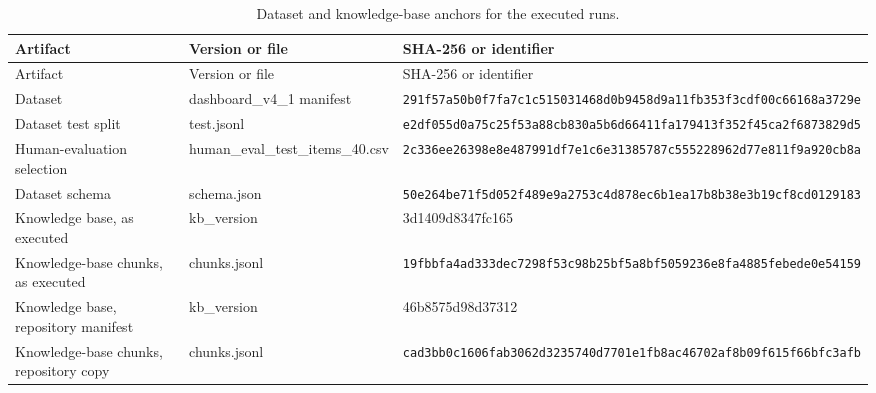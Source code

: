 \begingroup\footnotesize\setlength{\tabcolsep}{3pt}\sloppy
\begin{longtable}[]{@{}
  >{\raggedright\arraybackslash}p{}
  >{\raggedright\arraybackslash}p{}
  >{\raggedright\arraybackslash}p{}@{}}
\caption{Dataset and knowledge-base anchors for the executed runs.}\tabularnewline
\toprule\noalign{}
\begin{minipage}[b]{\linewidth}\raggedright
Artifact
\end{minipage} & \begin{minipage}[b]{\linewidth}\raggedright
Version or file
\end{minipage} & \begin{minipage}[b]{\linewidth}\raggedright
SHA-256 or identifier
\end{minipage} \\
\midrule\noalign{}
\endfirsthead
\toprule\noalign{}
\begin{minipage}[b]{\linewidth}\raggedright
Artifact
\end{minipage} & \begin{minipage}[b]{\linewidth}\raggedright
Version or file
\end{minipage} & \begin{minipage}[b]{\linewidth}\raggedright
SHA-256 or identifier
\end{minipage} \\
\midrule\noalign{}
\endhead
\bottomrule\noalign{}
\endlastfoot
Dataset & dashboard\_v4\_1 manifest & \nolinkurl{291f57a50b0f7fa7c1c515031468d0b9458d9a11fb353f3cdf00c66168a3729e} \\
Dataset test split & test.jsonl & \nolinkurl{e2df055d0a75c25f53a88cb830a5b6d66411fa179413f352f45ca2f6873829d5} \\
Human-evaluation selection & human\_eval\_test\_items\_40.csv & \nolinkurl{2c336ee26398e8e487991df7e1c6e31385787c555228962d77e811f9a920cb8a} \\
Dataset schema & schema.json & \nolinkurl{50e264be71f5d052f489e9a2753c4d878ec6b1ea17b8b38e3b19cf8cd0129183} \\
Knowledge base, as executed & kb\_version & 3d1409d8347fc165 \\
Knowledge-base chunks, as executed & chunks.jsonl & \nolinkurl{19fbbfa4ad333dec7298f53c98b25bf5a8bf5059236e8fa4885febede0e54159} \\
Knowledge base, repository manifest & kb\_version & 46b8575d98d37312 \\
Knowledge-base chunks, repository copy & chunks.jsonl & \nolinkurl{cad3bb0c1606fab3062d3235740d7701e1fb8ac46702af8b09f615f66bfc3afb} \\
\end{longtable}
\endgroup


